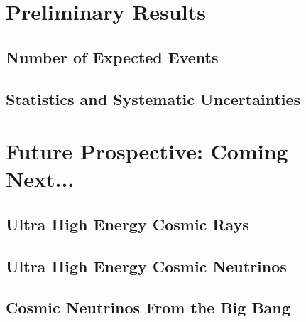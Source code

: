 \documentclass[12pt,twoside,letterpaper]{article}
\begin{document}
\section{Preliminary Results} 

\subsection{Number of Expected Events} 

\subsection{Statistics and Systematic Uncertainties} 

\section{Future Prospective: Coming Next...} 

\subsection{Ultra High Energy Cosmic Rays} 

\subsection{Ultra High Energy Cosmic Neutrinos} 

\subsection{Cosmic Neutrinos From the Big Bang} 
\end{document}

